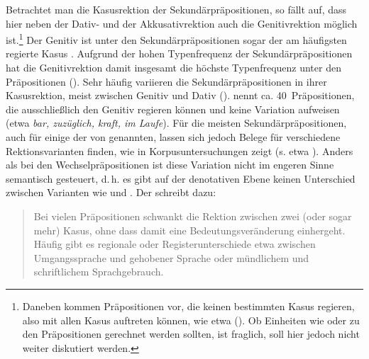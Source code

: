 Betrachtet man die Kasusrektion der Sekundärpräpositionen, so fällt auf, dass hier neben der Dativ- und der Akkusativrektion auch die Genitivrektion möglich ist.\footnote{Daneben kommen Präpositionen vor, die keinen bestimmten Kasus regieren, also mit allen Kasus auftreten können, wie etwa  (\cites[40--41]{Lindqvist1994}[§1452]{Duden2022}). Ob Einheiten wie  oder  zu den Präpositionen gerechnet werden sollten, ist fraglich, soll hier jedoch nicht weiter diskutiert werden.} 
Der Genitiv ist unter den Sekundärpräpositionen sogar der am häufigsten regierte Kasus \citep[s.][16]{Lehmann1992}. 
Aufgrund der hohen Typenfrequenz der Sekundärpräpositionen hat die Genitivrektion damit insgesamt die höchste Typenfrequenz unter den Präpositionen (\cites[s.][131--132]{Eroms1981}[638]{Griehaber2009}). 
Sehr häufig variieren die Sekundärpräpositionen in ihrer Kasusrektion, meist zwischen Genitiv und Dativ (\cites[s.][§1449--1451]{Duden2022}[zu Schwankungen bei historisch neuen Akkusativpr{\"a}positionen wie etwa \textit{pro} s.][]{Hentschel1989}). 
\citet[32]{Lindqvist1994} nennt ca. 40~Pr{\"a}positionen, die ausschlie{\ss}lich den Genitiv regieren können und keine Variation aufweisen (etwa \textit{bar, zuz{\"u}glich, kraft, im Laufe}). 
Für die meisten Sekundärpräpositionen, auch für einige der von \citet{Lindqvist1994} genannten, lassen sich jedoch Belege für verschiedene Rektionsvarianten finden, wie \citeauthor[]{DiMeola2000} in Korpusuntersuchungen zeigt (s. etwa \citeyear[]{DiMeola1999, DiMeola2000, DiMeola2006}). 
Anders als bei den Wechselpräpositionen ist diese Variation nicht im engeren Sinne semantisch gesteuert, d.\,h. es gibt auf der denotativen Ebene keinen Unterschied zwischen Varianten wie  und . 
Der \citet[]{Duden2022} schreibt dazu: 
\begin{quote}Bei vielen Präpositionen schwankt die Rektion zwischen zwei (oder sogar mehr) Kasus, ohne dass damit eine Bedeutungsveränderung einhergeht. Häufig gibt es regionale oder Registerunterschiede etwa zwischen Umgangssprache und gehobener 
Sprache oder mündlichem und schriftlichem Sprachgebrauch.~\citep[{\S}1448]{Duden2022}\end{quote}
